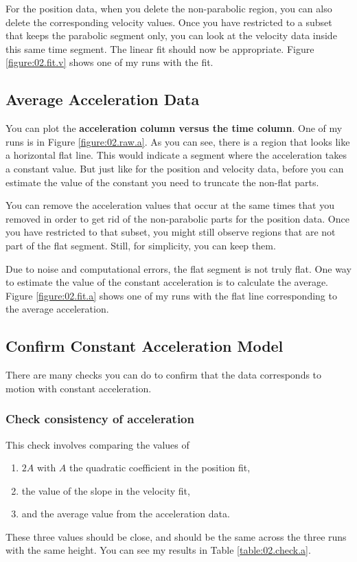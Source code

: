 For the position data, when you delete the non-parabolic region, you can also delete the corresponding velocity values. Once you have restricted to a subset that keeps the parabolic segment only, you can look at the velocity data inside this same time segment. The linear fit should now be appropriate. Figure \ref{figure:02.fit.v} shows one of my runs with the fit.
\subsection{Average Acceleration Data}
You can plot the \textbf{acceleration column versus the time column}. One of my runs is in Figure \ref{figure:02.raw.a}. As you can see, there is a region that looks like a horizontal flat line. This would indicate a segment where the acceleration takes a constant value. But just like for the position and velocity data, before you can estimate the value of the constant you need to truncate the non-flat parts.

You can remove the acceleration values that occur at the same times that you removed in order to get rid of the non-parabolic parts for the position data. Once you have restricted to that subset, you might still observe regions that are not part of the flat segment. Still, for simplicity, you can keep them.

Due to noise and computational errors, the flat segment is not truly flat. One way to estimate the value of the constant acceleration is to calculate the average. Figure \ref{figure:02.fit.a} shows one of my runs with the flat line corresponding to the average acceleration. 
\subsection{Confirm Constant Acceleration Model}
There are many checks you can do to confirm that the data corresponds to motion with constant acceleration.
\subsubsection{Check consistency of acceleration}
This check involves comparing the values of
\begin{enumerate}
    \item $2A$ with $A$ the quadratic coefficient in the position fit,
    \item the value of the slope in the velocity fit,
    \item and the average value from the acceleration data.
\end{enumerate}
These three values should be close, and should be the same across the three runs with the same height. You can see my results in Table \ref{table:02.check.a}.
